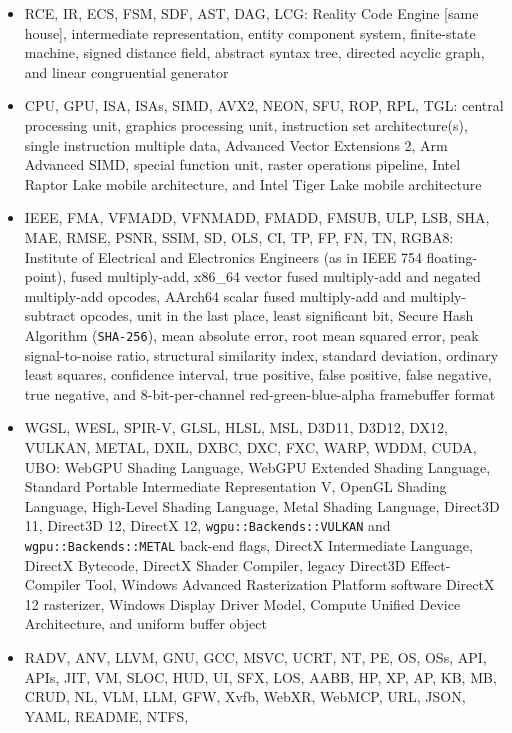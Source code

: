 \documentclass[10pt,letterpaper]{article}
\providecommand{\tightlist}{\setlength{\itemsep}{1pt}\setlength{\parskip}{0pt}}
\begin{document}
\begin{itemize}
\tightlist
\item
  RCE, IR, ECS, FSM, SDF, AST, DAG, LCG: Reality Code Engine {[}same
  house{]}, intermediate representation, entity component system,
  finite-state machine, signed distance field, abstract syntax tree,
  directed acyclic graph, and linear congruential generator
\item
  CPU, GPU, ISA, ISAs, SIMD, AVX2, NEON, SFU, ROP, RPL, TGL: central
  processing unit, graphics processing unit, instruction set
  architecture(s), single instruction multiple data, Advanced Vector
  Extensions 2, Arm Advanced SIMD, special function unit, raster
  operations pipeline, Intel Raptor Lake mobile architecture, and Intel
  Tiger Lake mobile architecture
\item
  IEEE, FMA, VFMADD, VFNMADD, FMADD, FMSUB, ULP, LSB, SHA, MAE, RMSE,
  PSNR, SSIM, SD, OLS, CI, TP, FP, FN, TN, RGBA8: Institute of
  Electrical and Electronics Engineers (as in IEEE 754 floating-point),
  fused multiply-add, x86\_64 vector fused multiply-add and negated
  multiply-add opcodes, AArch64 scalar fused multiply-add and
  multiply-subtract opcodes, unit in the last place, least significant
  bit, Secure Hash Algorithm (\texttt{SHA-256}), mean absolute error,
  root mean squared error, peak signal-to-noise ratio, structural
  similarity index, standard deviation, ordinary least squares,
  confidence interval, true positive, false positive, false negative,
  true negative, and 8-bit-per-channel red-green-blue-alpha framebuffer
  format
\item
  WGSL, WESL, SPIR-V, GLSL, HLSL, MSL, D3D11, D3D12, DX12, VULKAN,
  METAL, DXIL, DXBC, DXC, FXC, WARP, WDDM, CUDA, UBO: WebGPU Shading
  Language, WebGPU Extended Shading Language, Standard Portable
  Intermediate Representation V, OpenGL Shading Language, High-Level
  Shading Language, Metal Shading Language, Direct3D 11, Direct3D 12,
  DirectX 12, \texttt{wgpu::Backends::VULKAN} and
  \texttt{wgpu::Backends::METAL} back-end flags, DirectX Intermediate
  Language, DirectX Bytecode, DirectX Shader Compiler, legacy Direct3D
  Effect-Compiler Tool, Windows Advanced Rasterization Platform software
  DirectX 12 rasterizer, Windows Display Driver Model, Compute Unified
  Device Architecture, and uniform buffer object
\item
  RADV, ANV, LLVM, GNU, GCC, MSVC, UCRT, NT, PE, OS, OSs, API, APIs,
  JIT, VM, SLOC, HUD, UI, SFX, LOS, AABB, HP, XP, AP, KB, MB, CRUD, NL,
  VLM, LLM, GFW, Xvfb, WebXR, WebMCP, URL, JSON, YAML, README, NTFS,

\end{itemize}
\end{document}
